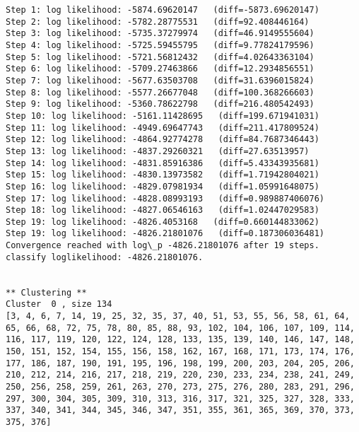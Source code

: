 \documentclass{article}
\begin{document}
    \begin{Verbatim}[commandchars=\\\{\}]
Step 1: log likelihood: -5874.69620147   (diff=-5873.69620147)
Step 2: log likelihood: -5782.28775531   (diff=92.408446164)
Step 3: log likelihood: -5735.37279974   (diff=46.9149555604)
Step 4: log likelihood: -5725.59455795   (diff=9.77824179596)
Step 5: log likelihood: -5721.56812432   (diff=4.02643363104)
Step 6: log likelihood: -5709.27463866   (diff=12.2934856551)
Step 7: log likelihood: -5677.63503708   (diff=31.6396015824)
Step 8: log likelihood: -5577.26677048   (diff=100.368266603)
Step 9: log likelihood: -5360.78622798   (diff=216.480542493)
Step 10: log likelihood: -5161.11428695   (diff=199.671941031)
Step 11: log likelihood: -4949.69647743   (diff=211.417809524)
Step 12: log likelihood: -4864.92774278   (diff=84.7687346443)
Step 13: log likelihood: -4837.29260321   (diff=27.63513957)
Step 14: log likelihood: -4831.85916386   (diff=5.43343935681)
Step 15: log likelihood: -4830.13973582   (diff=1.71942804021)
Step 16: log likelihood: -4829.07981934   (diff=1.05991648075)
Step 17: log likelihood: -4828.08993193   (diff=0.989887406076)
Step 18: log likelihood: -4827.06546163   (diff=1.02447029583)
Step 19: log likelihood: -4826.4053168   (diff=0.660144833062)
Step 19: log likelihood: -4826.21801076   (diff=0.187306036481)
Convergence reached with log\_p -4826.21801076 after 19 steps.
classify loglikelihood: -4826.21801076.


** Clustering **
Cluster  0 , size 134
[3, 4, 6, 7, 14, 19, 25, 32, 35, 37, 40, 51, 53, 55, 56, 58, 61, 64, 65, 66, 68, 72, 75, 78, 80, 85, 88, 93, 102, 104, 106, 107, 109, 114, 116, 117, 119, 120, 122, 124, 128, 133, 135, 139, 140, 146, 147, 148, 150, 151, 152, 154, 155, 156, 158, 162, 167, 168, 171, 173, 174, 176, 177, 186, 187, 190, 191, 195, 196, 198, 199, 200, 203, 204, 205, 206, 210, 212, 214, 216, 217, 218, 219, 220, 230, 233, 234, 238, 241, 249, 250, 256, 258, 259, 261, 263, 270, 273, 275, 276, 280, 283, 291, 296, 297, 300, 304, 305, 309, 310, 313, 316, 317, 321, 325, 327, 328, 333, 337, 340, 341, 344, 345, 346, 347, 351, 355, 361, 365, 369, 370, 373, 375, 376] 


\end{Verbatim}
\end{document}
